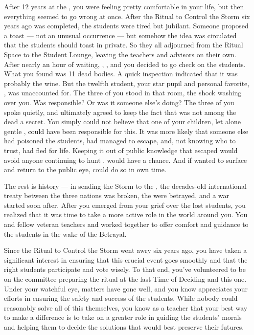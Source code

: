 \documentclass[char]{GL2020}
\begin{document}
After 12 years at the \pSchool{}, you were feeling pretty comfortable in your life, but then everything seemed to go wrong at once. After the Ritual to Control the Storm six years ago was completed, the students were tired but jubilant. Someone proposed a toast — not an unusual occurrence — but somehow the idea was circulated that the students should toast in private. So they all adjourned from the Ritual Space to the Student Lounge, leaving the teachers and advisors on their own. After nearly an hour of waiting, \cDiplomat{\intro}, \cPrincipal{\intro}, and you decided to go check on the students. What you found was 11 dead bodies. A quick inspection indicated that it was probably the wine. But the twelfth student, your star pupil and personal favorite, \cKidScientist{\intro}, was unaccounted for. The three of you stood in that room, the shock washing over you. Was \cKidScientist{} responsible? Or was it someone else's doing? The three of you spoke quietly, and ultimately agreed to keep the fact that \cKidScientist{} was not among the dead a secret. You simply could not believe that one of your children, let alone gentle \cKidScientist{}, could have been responsible for this. It was more likely that someone else had poisoned the students, \cKidScientist{} had managed to escape, and, not knowing who to trust, had fled for \cKidScientist{\their} life. Keeping it out of public knowledge that \cKidScientist{\they} escaped would avoid anyone continuing to hunt \cKidScientist{\them}. \cKidScientist{\They} would have a chance. And if \cKidScientist{\they} wanted to surface and return to the public eye, \cKidScientist{\they} could do so in \cKidScientist{\their} own time. 

The rest is history — in sending the Storm to the \pShip{}, the decades-old international treaty between the three nations was broken, the \pShip{} were betrayed, and a war started soon after. After you emerged from your grief over the lost students, you realized that it was time to take a more active role in the world around you. You and fellow veteran teachers \cEthics{\intro} and \cFlowPriest{} worked together to offer comfort and guidance to the students in the wake of the Betrayal. 

Since the Ritual to Control the Storm went awry six years ago, you have taken a significant interest in ensuring that this crucial event goes smoothly and that the right students participate and vote wisely. To that end, you've volunteered to be on the committee preparing the ritual at the last Time of Deciding and this one. Under your watchful eye, matters have gone well, and you know \cPrincipal{\full} appreciates your efforts in ensuring the safety and success of the students. While nobody could reasonably solve all of this themselves, you know as a teacher that your best way to make a difference is to take on a greater role in guiding the students' morals and helping them to decide the solutions that would best preserve their futures. 
\end{document}

